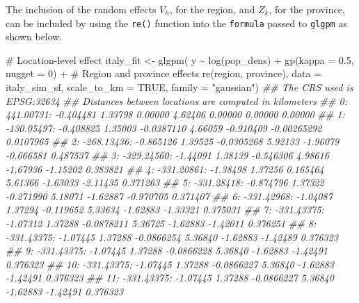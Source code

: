 \documentclass[
  letterpaper,
]{krantz}
\newenvironment{Shaded}{\begin{snugshade}}{\end{snugshade}}
\newcommand{\AttributeTok}[1]{\textcolor[rgb]{0.40,0.45,0.13}{#1}}
\newcommand{\CommentTok}[1]{\textcolor[rgb]{0.37,0.37,0.37}{#1}}
\newcommand{\ConstantTok}[1]{\textcolor[rgb]{0.56,0.35,0.01}{#1}}
\newcommand{\DecValTok}[1]{\textcolor[rgb]{0.68,0.00,0.00}{#1}}
\newcommand{\DocumentationTok}[1]{\textcolor[rgb]{0.37,0.37,0.37}{\textit{#1}}}
\newcommand{\FloatTok}[1]{\textcolor[rgb]{0.68,0.00,0.00}{#1}}
\newcommand{\FunctionTok}[1]{\textcolor[rgb]{0.28,0.35,0.67}{#1}}
\newcommand{\NormalTok}[1]{\textcolor[rgb]{0.00,0.23,0.31}{#1}}
\newcommand{\OtherTok}[1]{\textcolor[rgb]{0.00,0.23,0.31}{#1}}
\newcommand{\SpecialCharTok}[1]{\textcolor[rgb]{0.37,0.37,0.37}{#1}}
\newcommand{\StringTok}[1]{\textcolor[rgb]{0.13,0.47,0.30}{#1}}
\begin{document}
The inclusion of the random effects \(V_h\), for the region, and
\(Z_k\), for the province, can be included by using the \texttt{re()}
function into the \texttt{formula} passed to \texttt{glgpm} as shown
below.

\begin{Shaded}
\begin{Highlighting}[]

                        \CommentTok{\# Location{-}level effect}
\NormalTok{italy\_fit }\OtherTok{\textless{}{-}} \FunctionTok{glgpm}\NormalTok{( y }\SpecialCharTok{\textasciitilde{}} \FunctionTok{log}\NormalTok{(pop\_dens) }\SpecialCharTok{+} \FunctionTok{gp}\NormalTok{(}\AttributeTok{kappa =} \FloatTok{0.5}\NormalTok{, }\AttributeTok{nugget =} \DecValTok{0}\NormalTok{) }\SpecialCharTok{+}
                        \CommentTok{\# Region and province effects}
                        \FunctionTok{re}\NormalTok{(region, province),}
         \AttributeTok{data =}\NormalTok{ italy\_sim\_sf, }\AttributeTok{scale\_to\_km =} \ConstantTok{TRUE}\NormalTok{,}
         \AttributeTok{family =} \StringTok{"gaussian"}\NormalTok{)}
\DocumentationTok{\#\# The CRS used is EPSG:32634 }
\DocumentationTok{\#\# Distances between locations are computed in kilometers }
\DocumentationTok{\#\#   0:     441.00731: {-}0.404481  1.33798  0.00000  4.62406  0.00000  0.00000  0.00000}
\DocumentationTok{\#\#   1:    {-}130.05497: {-}0.408825  1.35003 {-}0.0387110  4.66059 {-}0.910409 {-}0.00265292 0.0107965}
\DocumentationTok{\#\#   2:    {-}268.13436: {-}0.865126  1.39525 {-}0.0305268  5.92133 {-}1.96079 {-}0.666581 0.487537}
\DocumentationTok{\#\#   3:    {-}329.24560: {-}1.44091  1.38139 {-}0.546306  4.98616 {-}1.67936 {-}1.15202 0.383821}
\DocumentationTok{\#\#   4:    {-}331.20861: {-}1.38498  1.37256 0.165464  5.61366 {-}1.63033 {-}2.11435 0.371263}
\DocumentationTok{\#\#   5:    {-}331.28418: {-}0.874796  1.37322 {-}0.271990  5.18071 {-}1.62887 {-}0.970705 0.371407}
\DocumentationTok{\#\#   6:    {-}331.42968: {-}1.04087  1.37294 {-}0.119652  5.33634 {-}1.62883 {-}1.33321 0.375031}
\DocumentationTok{\#\#   7:    {-}331.43375: {-}1.07312  1.37288 {-}0.0878211  5.36725 {-}1.62883 {-}1.42011 0.376251}
\DocumentationTok{\#\#   8:    {-}331.43375: {-}1.07445  1.37288 {-}0.0866254  5.36840 {-}1.62883 {-}1.42489 0.376323}
\DocumentationTok{\#\#   9:    {-}331.43375: {-}1.07445  1.37288 {-}0.0866228  5.36840 {-}1.62883 {-}1.42491 0.376323}
\DocumentationTok{\#\#  10:    {-}331.43375: {-}1.07445  1.37288 {-}0.0866227  5.36840 {-}1.62883 {-}1.42491 0.376323}
\DocumentationTok{\#\#  11:    {-}331.43375: {-}1.07445  1.37288 {-}0.0866227  5.36840 {-}1.62883 {-}1.42491 0.376323}


\end{Highlighting}
\end{Shaded}
\end{document}
